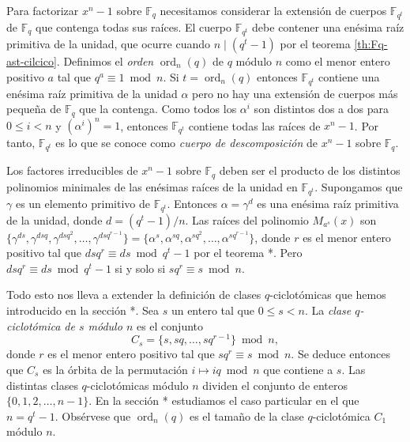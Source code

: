 Para factorizar \(x^n - 1\) sobre \(\mathbb F_q\) necesitamos considerar la extensión de cuerpos \(\mathbb F_{q^t}\) de \(\mathbb F_q\) que contenga todas sus raíces.
El cuerpo \(\mathbb F_{q^t}\) debe contener una enésima raíz primitiva de la unidad, que ocurre cuando \(n \mid (q^t - 1)\) por el teorema \ref{th:Fq-ast-cilcico}.
Definimos el \textit{orden} \(\operatorname{ord}_n(q)\) de \(q\) módulo \(n\) como el menor entero positivo \(a\) tal que \(q^{a} \equiv 1 \bmod n\).
Si \(t = \operatorname{ord}_n(q)\) entonces \(\mathbb F_{q^t}\) contiene una enésima raíz primitiva de la unidad \(\alpha\) pero no hay una extensión de cuerpos más pequeña de \(\mathbb F_q\) que la contenga.
Como todos los \(\alpha^{i}\) son distintos dos a dos para \(0 \leq i < n\) y \((\alpha^{i})^n = 1\), entonces \(\mathbb F_{q^t}\) contiene todas las raíces de \(x^n - 1\).
Por tanto, \(\mathbb F_{q^t}\) es lo que se conoce como \textit{cuerpo de descomposición} de \(x^n - 1\) sobre \(\mathbb F_q\).

Los factores irreducibles de \(x^n - 1\) sobre \(\mathbb F_q\) deben ser el producto de los distintos polinomios minimales de las enésimas raíces de la unidad en \(\mathbb F_{q^t}\).
Supongamos que \(\gamma\) es un elemento primitivo de \(\mathbb F_{q^t}\).
Entonces \(\alpha = \gamma^d\) es una enésima raíz primitiva de la unidad, donde \(d = (q^t - 1)/n\).
Las raíces del polinomio \(M_{a^s}(x)\) son \(\{\gamma^{ds}, \gamma^{dsq}, \gamma^{dsq^2}, \dots, \gamma^{dsq^{r-1}}\} = \{\alpha^s, \alpha^{sq}, \alpha^{sq^2}, \dots, \alpha^{sq^{r-1}}\}\), donde \(r\) es el menor entero positivo tal que \(dsq^r \equiv ds \bmod q^t - 1\) por el teorema *.
Pero \(dsq^r \equiv ds \bmod q^t - 1\) si y solo si \(sq^r \equiv s \bmod n\).

Todo esto nos lleva a extender la definición de clases \(q\)-ciclotómicas que hemos introducido en la sección *.
Sea \(s\) un entero tal que \(0 \leq s < n\).
La \textit{clase \(q\)-ciclotómica de \(s\) módulo \(n\)} es el conjunto
\[
  C_s = \{s, sq, \dots, sq^{r-1}\} \bmod n, 
\]
donde \(r\) es el menor entero positivo tal que \(sq^r \equiv s \bmod n\).
Se deduce entonces que \(C_s\) es la órbita de la permutación \(i \mapsto iq \bmod n\) que contiene a \(s\).
Las distintas clases \(q\)-ciclotómicas módulo \(n\) dividen el conjunto de enteros \(\{0, 1, 2, \dots, n - 1\}\).
En la sección * estudiamos el caso particular en el que \(n = q^t - 1\).
Obsérvese que \(\operatorname{ord}_n(q)\) es el tamaño de la clase \(q\)-ciclotómica \(C_1\) módulo \(n\).

